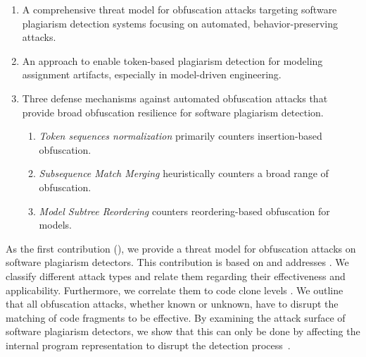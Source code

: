 \begin{enumerate}[label=\textbf{C\arabic*}]
    \item \label{c1} A comprehensive threat model for obfuscation attacks targeting software plagiarism detection systems focusing on automated, behavior-preserving attacks.\\ \textbf{ } 
    \item \label{c2} An approach to enable token-based plagiarism detection for modeling assignment artifacts, especially in model-driven engineering.\\ \textbf{  } 
    \item \label{c3} Three defense mechanisms against automated obfuscation attacks that provide broad obfuscation resilience for software plagiarism detection. %
        \begin{enumerate}[label=\textbf{C3.\arabic*}]
             \item \label{c3.1} \textit{Token sequences normalization} primarily counters insertion-based obfuscation.\\ \textbf{} 
             \item \label{c3.2} \textit{Subsequence Match Merging} heuristically counters a broad range of obfuscation.\\ \textbf{ } 
             \item \label{c3.3} \textit{Model Subtree Reordering} counters reordering-based obfuscation for models.\\ \textbf{} 
        \end{enumerate}
\end{enumerate}
    

As the first contribution (), we provide a threat model for obfuscation attacks on software plagiarism detectors.
This contribution is based on  and addresses .
We classify different attack types and relate them regarding their effectiveness and applicability.
Furthermore, we correlate them to code clone levels \cite{Faidhi1987, Karnalim2016}.
We outline that all obfuscation attacks, whether known or unknown, have to disrupt the matching of code fragments to be effective. 
By examining the attack surface of software plagiarism detectors, we show that this can only be done by affecting the internal program representation to disrupt the detection process~\cite{Saglam2024b}.

